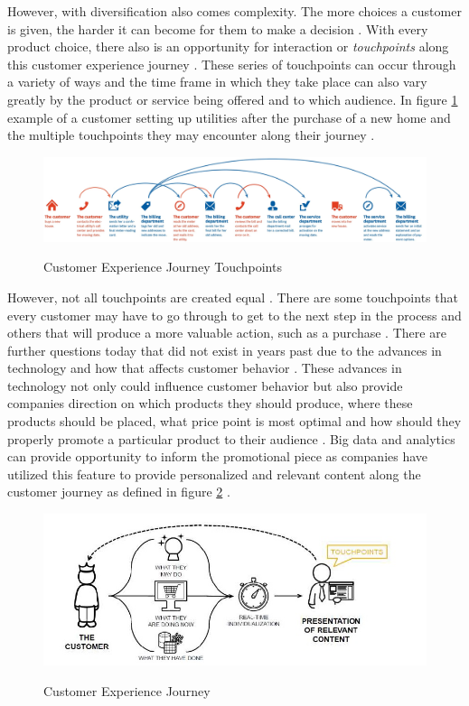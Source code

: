 \documentclass[sigconf]{acmart}
\begin{document}
However, with diversification also comes complexity. The more choices a customer is given, the harder it can become for them to make a decision \cite{Stoicescu2015}. With every product choice, there also is an opportunity for interaction or \textit{touchpoints} along this customer experience journey \cite{Meyer2007}. These series of touchpoints can occur through a variety of ways and the time frame in which they take place can also vary greatly by the product or service being offered and to which audience. In figure \ref{f:Customer Experience Journey}  example of a customer setting up utilities after the purchase of a new home and the multiple touchpoints they may encounter along their journey \cite{Rawson2013}.

\begin{figure}[ht!]
  \centering\includegraphics[width=\columnwidth]{example.jpg}
  \caption{Customer Experience Journey Touchpoints}\cite{Rawson2013}\label{f:Customer Experience Journey}
\end{figure}

However, not all touchpoints are created equal \cite{Meyer2007}. There are some touchpoints that every customer may have to go through to get to the next step in the process and others that will produce a more valuable action, such as a purchase \cite{Meyer2007}. There are further questions today that did not exist in years past due to the advances in technology and how that affects customer behavior \cite{Kannan2017}. These advances in technology not only could influence customer behavior but also provide companies direction on which products they should produce, where these products should be placed, what price point is most optimal and how should they properly promote a particular product to their audience \cite{Kannan2017}. Big data and analytics can provide opportunity to inform the promotional piece as companies have utilized this feature to provide personalized and relevant content along  the customer journey as defined in figure \ref{f:Customer Journey} \cite{Stoicescu2015}. 

\begin{figure}[ht!]
  \centering\includegraphics[width=\columnwidth]{customerjourney.jpg}
  \caption{Customer Experience Journey}\cite{Stoicescu2015}\label{f:Customer Journey}
\end{figure}
\end{document}
